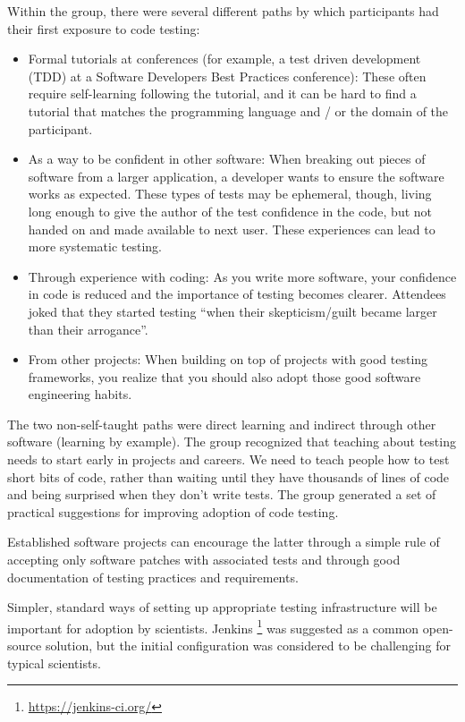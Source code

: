 \documentclass[11pt, oneside]{amsart}
\begin{document}
Within the group, there were several different paths by which participants had their 
first exposure to code testing:
\begin{itemize}
\item Formal tutorials at conferences (for example, a test driven development (TDD) at a Software Developers Best Practices conference): These often require self-learning following the tutorial, and it can be hard to find a tutorial that matches the programming language and / or the domain of the participant. 
\item As a way to be confident in other software: When breaking out pieces of software from a larger application, a developer wants to ensure the software works as expected. These types of tests may be ephemeral, though, living long enough to give the author of the test confidence in the code, but not handed on and made available to next user. These experiences can lead to more systematic testing. 
\item Through experience with coding: As you write more software, your confidence in code is reduced and the importance of testing becomes clearer. Attendees joked that they started testing ``when their skepticism/guilt became larger than their arrogance''. 
\item From other projects: When building on top of projects with good testing frameworks, you realize that you should also adopt those good software engineering habits.  
\end{itemize}

The two non-self-taught paths were direct learning and indirect through other software (learning by example). The group recognized that teaching about testing needs to start early in projects and careers. We need to teach people how to test short bits of code, rather than waiting until they have thousands of lines of code and being surprised when they don't write tests. The group generated a set of practical suggestions for improving adoption of code testing.

Established software projects can encourage the latter through a simple rule of accepting only software patches with associated tests and through good documentation of testing practices and requirements. 

Simpler, standard ways of setting up appropriate testing infrastructure will be important for adoption by scientists. Jenkins \footnote{\url{https://jenkins-ci.org/}} was suggested as a common open-source solution, but the initial configuration was considered to be challenging for typical scientists.
\end{document}
